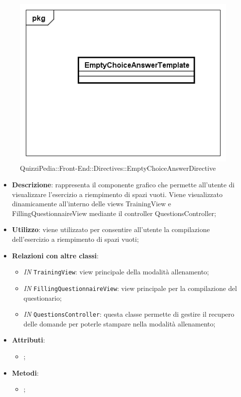 		\begin{figure}[ht]
			\centering
			\includegraphics[scale=0.5,keepaspectratio]{UML/Classi/Front-End/QuizziPedia_Front-end_Templates_EmptySpaceAnswerTemplate.png}
			\caption{QuizziPedia::Front-End::Directives::EmptyChoiceAnswerDirective}
		\end{figure} \FloatBarrier
		
		\begin{itemize}
			\item \textbf{Descrizione}: rappresenta il componente grafico che permette all'utente di visualizzare l'esercizio a riempimento di spazi vuoti. Viene visualizzato dinamicamente all'interno delle views TrainingView e FillingQuestionnaireView mediante il controller QuestionsController;
			\item \textbf{Utilizzo}: viene utilizzato per consentire all'utente la compilazione dell'esercizio a riempimento di spazi vuoti;
			\item \textbf{Relazioni con altre classi}: 
			\begin{itemize}
				\item \textit{IN} \texttt{TrainingView}: view principale della modalità allenamento; 
				\item \textit{IN} \texttt{FillingQuestionnaireView}: view principale per la compilazione del questionario;
				\item \textit{IN} \texttt{QuestionsController}: questa classe permette di gestire il recupero delle domande per poterle stampare nella modalità allenamento;
			\end{itemize}
			\item \textbf{Attributi}: 
			\begin{itemize}
				\item ;
			\end{itemize}
			\item \textbf{Metodi}: 
			\begin{itemize}
				\item ;
			\end{itemize}
		\end{itemize}
		

